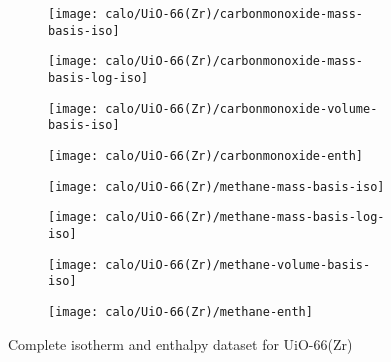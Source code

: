\begin{figure}[H]
    \begin{subfigure}{0.25\textwidth}
        \texttt{[image: calo/UiO-66(Zr)/carbonmonoxide-mass-basis-iso]}%
        \label{appx:fig:shaping:uio66comass}
    \end{subfigure}%
    \begin{subfigure}{0.25\textwidth}
        \texttt{[image: calo/UiO-66(Zr)/carbonmonoxide-mass-basis-log-iso]}%
        \label{appx:fig:shaping:uio66comasslog}
    \end{subfigure}%
    \begin{subfigure}{0.25\textwidth}
        \texttt{[image: calo/UiO-66(Zr)/carbonmonoxide-volume-basis-iso]}%
        \label{appx:fig:shaping:uio66covolume}
    \end{subfigure}%
    \begin{subfigure}{0.25\textwidth}
        \texttt{[image: calo/UiO-66(Zr)/carbonmonoxide-enth]}%
        \label{appx:fig:shaping:uio66coenth}%
    \end{subfigure}%

    \begin{subfigure}{0.25\textwidth}
        \texttt{[image: calo/UiO-66(Zr)/methane-mass-basis-iso]}%
        \label{appx:fig:shaping:uio66ch4mass}
    \end{subfigure}%
    \begin{subfigure}{0.25\textwidth}
        \texttt{[image: calo/UiO-66(Zr)/methane-mass-basis-log-iso]}%
        \label{appx:fig:shaping:uio66ch4masslog}
    \end{subfigure}%
    \begin{subfigure}{0.25\textwidth}
        \texttt{[image: calo/UiO-66(Zr)/methane-volume-basis-iso]}%
        \label{appx:fig:shaping:uio66ch4volume}
    \end{subfigure}%
    \begin{subfigure}{0.25\textwidth}
        \texttt{[image: calo/UiO-66(Zr)/methane-enth]}%
        \label{appx:fig:shaping:uio66ch4enth}%
    \end{subfigure}%

    \caption{Complete isotherm and enthalpy dataset for UiO-66(Zr)}
\end{figure}

